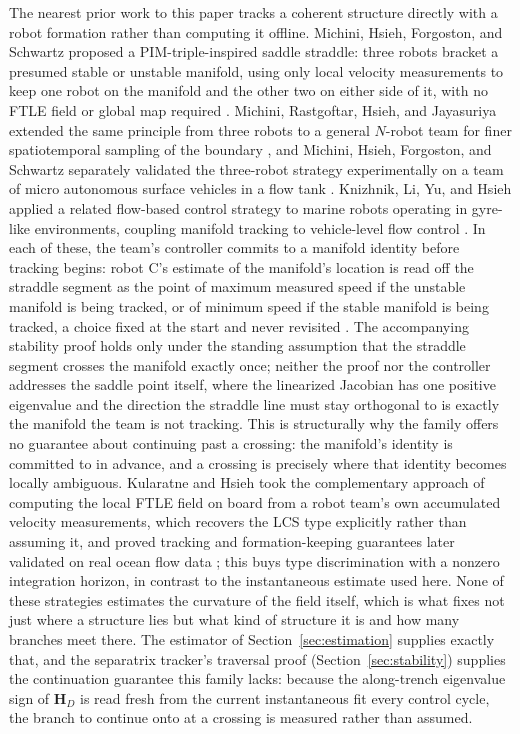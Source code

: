 \documentclass[lettersize,journal]{IEEEtran}
\begin{document}
The nearest prior work to this paper tracks a coherent structure directly
with a robot formation rather than computing it offline. Michini, Hsieh,
Forgoston, and Schwartz proposed a PIM-triple-inspired saddle straddle:
three robots bracket a presumed stable or unstable manifold, using only
local velocity measurements to keep one robot on the manifold and the other
two on either side of it, with no FTLE field or global map required \cite{9}.
Michini, Rastgoftar, Hsieh, and Jayasuriya extended the same principle from
three robots to a general $N$-robot team for finer spatiotemporal sampling
of the boundary \cite{10}, and Michini, Hsieh, Forgoston, and Schwartz separately
validated the three-robot strategy experimentally on a team of micro
autonomous surface vehicles in a flow tank \cite{11}. Knizhnik, Li, Yu, and Hsieh
applied a related flow-based control strategy to marine robots operating in
gyre-like environments, coupling manifold tracking to vehicle-level flow
control \cite{12}. In each of these, the team's controller commits to a manifold
identity before tracking begins: robot C's estimate of the manifold's
location is read off the straddle segment as the point of maximum measured
speed if the unstable manifold is being tracked, or of minimum speed if the
stable manifold is being tracked, a choice fixed at the start and never
revisited \cite{9}. The accompanying stability proof holds only under the
standing assumption that the straddle segment crosses the manifold exactly
once; neither the proof nor the controller addresses the saddle point
itself, where the linearized Jacobian has one positive eigenvalue and the
direction the straddle line must stay orthogonal to is exactly the
manifold the team is not tracking. This is structurally why the family
offers no guarantee about continuing past a crossing: the manifold's
identity is committed to in advance, and a crossing is precisely where
that identity becomes locally ambiguous. Kularatne and Hsieh took the
complementary approach of computing the local FTLE field on board from a
robot team's own accumulated velocity measurements, which recovers the
LCS type explicitly rather than assuming it, and proved tracking and
formation-keeping guarantees later validated on real ocean flow data \cite{13};
this buys type discrimination with a nonzero integration horizon, in
contrast to the instantaneous estimate used here. None of these strategies
estimates the curvature of the field itself, which is what fixes not just
where a structure lies but what kind of structure it is and how many
branches meet there. The estimator of Section~\ref{sec:estimation} supplies
exactly that, and the separatrix tracker's traversal proof
(Section~\ref{sec:stability}) supplies the continuation guarantee this
family lacks: because the along-trench eigenvalue sign of $\mathbf{H}_D$ is
read fresh from the current instantaneous fit every control cycle, the
branch to continue onto at a crossing is measured rather than assumed.
\end{document}
